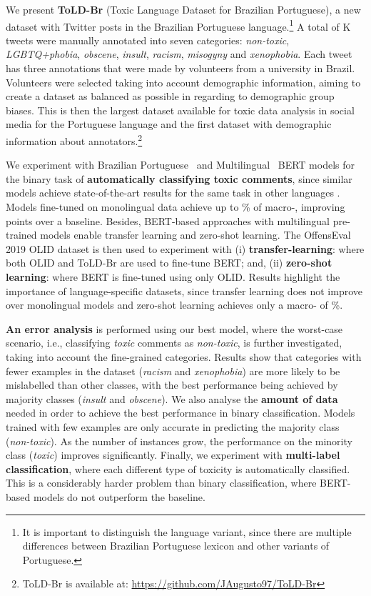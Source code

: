 \documentclass[11pt,a4paper]{article}
\begin{document}
We present \textbf{ToLD-Br} (Toxic Language Dataset for Brazilian Portuguese), a new dataset with Twitter posts in the Brazilian Portuguese language.\footnote{It is important to distinguish the language variant, since there are multiple differences between Brazilian Portuguese lexicon and other variants of Portuguese.} A total of K tweets were manually annotated into seven categories: \textit{non-toxic}, \textit{LGBTQ+phobia}, \textit{obscene}, \textit{insult}, \textit{racism}, \textit{misogyny} and \textit{xenophobia}. Each tweet has three annotations that were made by volunteers from a university in Brazil. Volunteers were selected taking into account demographic information, aiming to create a dataset as balanced as possible in regarding to demographic group biases.  
This is then the largest dataset available for toxic data analysis in social media for the Portuguese language and the first dataset with demographic information about annotators.\footnote{ToLD-Br is available at: \url{https://github.com/JAugusto97/ToLD-Br}}

We experiment with Brazilian Portuguese~\cite{souza2019portuguese} and Multilingual~\cite{Wolf2019HuggingFacesTS} BERT models \cite{devlin-etal-2019-bert} for the binary task of \textbf{automatically classifying toxic comments}, since similar models achieve state-of-the-art results for the same task in other languages \cite{zampieri-etal-2019-semeval}. Models fine-tuned on monolingual data achieve up to \% of macro-, improving  points over a baseline. 
Besides, BERT-based approaches with multilingual pre-trained models enable transfer learning and zero-shot learning. The OffensEval 2019 OLID dataset \cite{zampieri-etal-2019-predicting} is then used to experiment with (i) \textbf{transfer-learning}: where both OLID and ToLD-Br are used to fine-tune BERT; and, (ii) \textbf{zero-shot learning}: where BERT is fine-tuned using only OLID. Results highlight the importance of language-specific datasets, since transfer learning does not improve over monolingual models and zero-shot learning achieves only a macro- of \%. 

\textbf{An error analysis} is performed using our best model, where the worst-case scenario, i.e., classifying \textit{toxic} comments as \textit{non-toxic}, is further investigated, taking into account the fine-grained categories. Results show that categories with fewer examples in the dataset (\textit{racism} and \textit{xenophobia}) are more likely to be mislabelled than other classes, with the best performance being achieved by majority classes (\textit{insult} and \textit{obscene}). 
We also analyse the \textbf{amount of data} needed in order to achieve the best performance in binary classification. Models trained with few examples are only accurate in predicting the majority class (\textit{non-toxic}). As the number of instances grow, the performance on the minority class (\textit{toxic}) improves significantly.  
Finally, we experiment with \textbf{multi-label classification}, where each different type of toxicity is automatically classified. This is a considerably harder problem than binary classification, where BERT-based models do not outperform the baseline.
\end{document}
